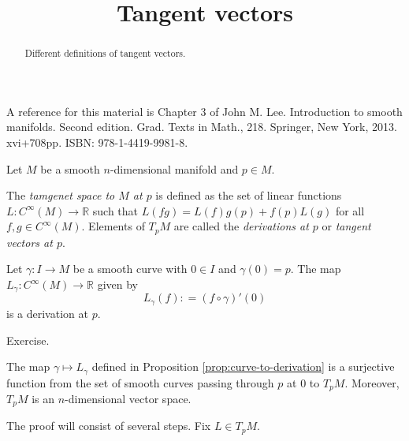 \documentclass{ximera}
\title{Tangent vectors}
\begin{document}
    \begin{abstract} Different definitions of tangent vectors.    \end{abstract}
    \maketitle

            A reference for this material is Chapter 3 of John M. Lee. Introduction to smooth manifolds. Second edition. Grad. Texts in Math., 218. Springer, New York, 2013. xvi+708pp. ISBN: 978-1-4419-9981-8.

    
    Let $M$ be a smooth $n$-dimensional manifold and $p \in M$. 

    \begin{definition}
    The \emph{tamgenet space to $M$ at $p$} is defined as the set of linear functions $L : C^{\infty } (M) \to \mathbb{R} $ such that $L(fg) = L (f) g(p) + f(p)L(g)$ for all $ f,g \in C^{\infty}(M) $.         Elements of $T_pM$ are called the \emph{derivations at $p$} or \emph{tangent vectors at $p$}.
    \end{definition}

    \begin{proposition}\label{prop:curve-to-derivation}
        Let $\gamma : I \to M$ be a smooth curve with $0 \in I$ and $\gamma (0) = p$. The map $L_{\gamma} : C^{\infty}(M) \to \mathbb{R}$ given by
        \[       L_{\gamma} (f) : = (f \circ \gamma )' (0)                  \]
        is a derivation at $p$.

    \begin{solution}
        Exercise.
    \end{solution}
    \end{proposition}

    \begin{theorem}\label{thm:tpm-definitions}
        The map $\gamma \mapsto L_{\gamma}$ defined in Proposition \ref{prop:curve-to-derivation} is a surjective function from the set of smooth curves passing through $p$ at $0$ to $T_pM$. Moreover, $T_pM$ is an $n$-dimensional vector space.
    \end{theorem}

    The proof will consist of several steps. Fix $L \in T_pM$. 
\end{document}
